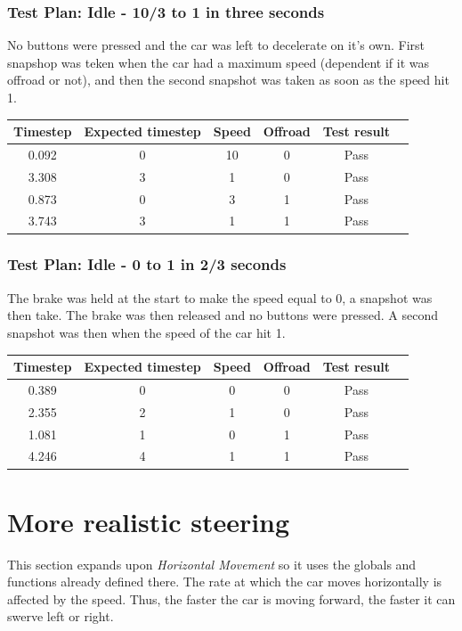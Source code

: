 \documentclass{article}
\begin{document}
\subsubsection{Test Plan: Idle - 10/3 to 1 in three seconds}
No buttons were pressed and the car was left to decelerate on it's own. First snapshop was teken when the car had a maximum speed (dependent if it was offroad or not), and then the second snapshot was taken as soon as the speed hit 1.
\begin{center}
\begin{tabular}{ c c c c c c }
Timestep	& Expected timestep	& Speed	& Offroad	& Test result	\\ \hline
0.092		& 0				& 10		& 0		& Pass	\\
3.308		& 3				& 1		& 0		& Pass	\\
0.873		& 0				& 3		& 1		& Pass	\\
3.743		& 3				& 1		& 1		& Pass	\\ \hline
\end{tabular}
\end{center}
\newpage

\subsubsection{Test Plan: Idle - 0 to 1 in 2/3 seconds}
The brake was held at the start to make the speed equal to 0, a snapshot was then take. The brake was then released and no buttons were pressed. A second snapshot was then when the speed of the car hit 1. 
\begin{center}
\begin{tabular}{ c c c c c c }
Timestep	& Expected timestep	& Speed	& Offroad	& Test result	\\ \hline
0.389		& 0				& 0		& 0		& Pass	\\
2.355		& 2				& 1		& 0		& Pass	\\
1.081		& 1				& 0		& 1		& Pass	\\
4.246		& 4				& 1		& 1		& Pass	\\ \hline
\end{tabular}
\end{center}

\clearpage

\section{More realistic steering}
This section expands upon \emph{Horizontal Movement} so it uses the globals and functions already defined there. The rate at which the car moves horizontally is affected by the speed. Thus, the faster the car is moving forward, the faster it can swerve left or right.
\end{document}
